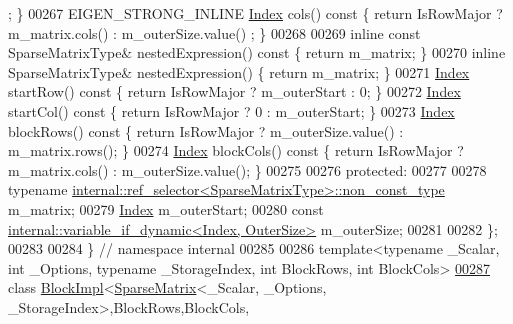\begin{DoxyCode}
      ; \}
00267     EIGEN\_STRONG\_INLINE \hyperlink{group___core___module_a554f30542cc2316add4b1ea0a492ff02}{Index} cols()\textcolor{keyword}{ const }\{ \textcolor{keywordflow}{return} IsRowMajor ? m\_matrix.cols() : m\_outerSize.value()
      ; \}
00268 
00269     \textcolor{keyword}{inline} \textcolor{keyword}{const} SparseMatrixType& nestedExpression()\textcolor{keyword}{ const }\{ \textcolor{keywordflow}{return} m\_matrix; \}
00270     \textcolor{keyword}{inline} SparseMatrixType& nestedExpression() \{ \textcolor{keywordflow}{return} m\_matrix; \}
00271     \hyperlink{group___core___module_a554f30542cc2316add4b1ea0a492ff02}{Index} startRow()\textcolor{keyword}{ const }\{ \textcolor{keywordflow}{return} IsRowMajor ? m\_outerStart : 0; \}
00272     \hyperlink{group___core___module_a554f30542cc2316add4b1ea0a492ff02}{Index} startCol()\textcolor{keyword}{ const }\{ \textcolor{keywordflow}{return} IsRowMajor ? 0 : m\_outerStart; \}
00273     \hyperlink{group___core___module_a554f30542cc2316add4b1ea0a492ff02}{Index} blockRows()\textcolor{keyword}{ const }\{ \textcolor{keywordflow}{return} IsRowMajor ? m\_outerSize.value() : m\_matrix.rows(); \}
00274     \hyperlink{group___core___module_a554f30542cc2316add4b1ea0a492ff02}{Index} blockCols()\textcolor{keyword}{ const }\{ \textcolor{keywordflow}{return} IsRowMajor ? m\_matrix.cols() : m\_outerSize.value(); \}
00275 
00276   \textcolor{keyword}{protected}:
00277 
00278     \textcolor{keyword}{typename} \hyperlink{class_eigen_1_1internal_1_1_tensor_lazy_evaluator_writable}{internal::ref\_selector<SparseMatrixType>::non\_const\_type}
       m\_matrix;
00279     \hyperlink{group___core___module_a554f30542cc2316add4b1ea0a492ff02}{Index} m\_outerStart;
00280     \textcolor{keyword}{const} \hyperlink{class_eigen_1_1internal_1_1variable__if__dynamic}{internal::variable\_if\_dynamic<Index, OuterSize>} 
      m\_outerSize;
00281 
00282 \};
00283 
00284 \} \textcolor{comment}{// namespace internal}
00285 
00286 \textcolor{keyword}{template}<\textcolor{keyword}{typename} \_Scalar, \textcolor{keywordtype}{int} \_Options, \textcolor{keyword}{typename} \_StorageIndex, \textcolor{keywordtype}{int} BlockRows, \textcolor{keywordtype}{int} BlockCols>
\hyperlink{class_eigen_1_1_block_impl_3_01_sparse_matrix_3_01___scalar_00_01___options_00_01___storage_inded3daac10033a16d6ca9aea81cdfe7eee}{00287} \textcolor{keyword}{class }\hyperlink{class_eigen_1_1_block_impl}{BlockImpl}<\hyperlink{group___sparse_core___module_class_eigen_1_1_sparse_matrix}{SparseMatrix}<\_Scalar, \_Options, \_StorageIndex>,BlockRows,BlockCols,

\end{DoxyCode}
